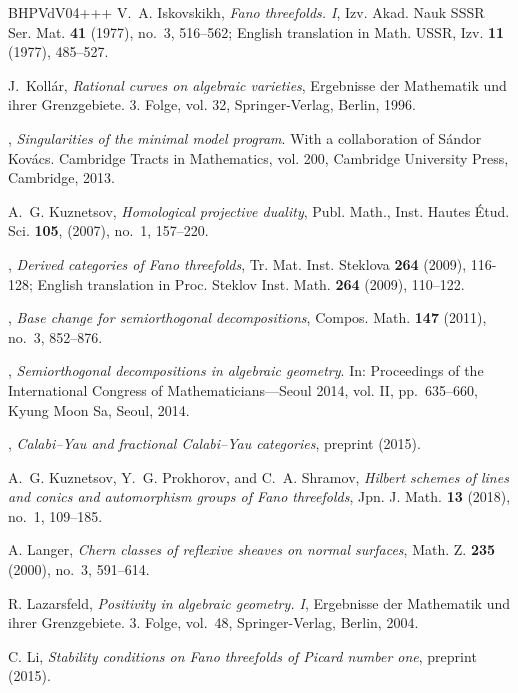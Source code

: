 \documentclass[11pt]{amsart}
\theoremstyle{definition}
\begin{document}
\begin{thebibliography}{BHPVdV04+++}
V.~A. Iskovskikh, \emph{Fano threefolds. {I}}, Izv. Akad. Nauk SSSR Ser. Mat.
  \textbf{41} (1977), no.~3, 516--562; English translation in Math. USSR, Izv. \textbf{11} (1977), 485--527.
  
J.~Koll{\'a}r, \emph{Rational curves on algebraic varieties}, 
Ergebnisse der Mathematik und ihrer Grenzgebiete. 3. Folge, vol. 32,
Springer-Verlag, Berlin, 1996.
  

\bysame, \emph{Singularities of the minimal model program}.
With a collaboration of S\'{a}ndor Kov\'{a}cs.
  Cambridge Tracts in Mathematics, vol. 200, Cambridge University Press,
  Cambridge, 2013.

A.~G. Kuznetsov, \emph{Homological projective duality}, 
Publ. Math., Inst. Hautes Étud. Sci. \textbf{105}, (2007), no.~1, 157--220.

\bysame, \emph{Derived categories of {F}ano threefolds},
Tr. Mat. Inst. Steklova \textbf{264} (2009), 116-128;
English translation in Proc. Steklov Inst. Math. \textbf{264} (2009), 110--122.

\bysame, \emph{Base change for semiorthogonal decompositions},
  Compos. Math. \textbf{147} (2011), no.~3, 852--876.

\bysame, \emph{Semiorthogonal decompositions in algebraic geometry}. In:
  Proceedings of the {I}nternational {C}ongress of {M}athematicians---{S}eoul
  2014, vol. {II}, pp.~635--660, Kyung Moon Sa, Seoul, 2014.

\bysame, \emph{Calabi--{Y}au and fractional {C}alabi--{Y}au categories},
  preprint  (2015).

A.~G. Kuznetsov, Y.~G. Prokhorov, and C.~A. Shramov,
  \emph{Hilbert schemes of lines and conics and automorphism groups of {F}ano
  threefolds}, Jpn. J. Math. \textbf{13} (2018), no.~1, 109--185.

A. Langer, \emph{Chern classes of reflexive sheaves on normal surfaces},
  Math. Z. \textbf{235} (2000), no.~3, 591--614.

R. Lazarsfeld, \emph{Positivity in algebraic geometry. {I}}, Ergebnisse der
  Mathematik und ihrer Grenzgebiete. 3. Folge, vol.~48, Springer-Verlag, Berlin, 2004.

C. Li, \emph{Stability conditions on Fano threefolds of Picard number
  one}, preprint  (2015).


\end{thebibliography}
\end{document}

